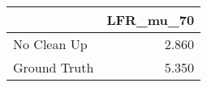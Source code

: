 \begin{tabular}{lr}
\toprule
{} & LFR_mu_70 \\
\midrule
No Clean Up  &     2.860 \\
Ground Truth &     5.350 \\
\bottomrule
\end{tabular}
